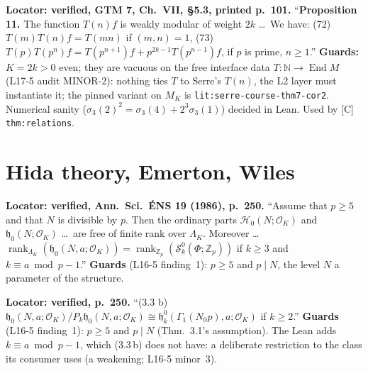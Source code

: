 \begin{hypothesis}\label{lit:serre-course-prop11}
   \leanok
  \textbf{Locator: verified, GTM 7, Ch.~VII, \S5.3, printed p.~101.} ``\textbf{Proposition 11.} The function $T(n)f$ is
  weakly modular of weight $2k$ \dots\ We have: (72) $T(m)T(n)f=T(mn)$ if $(m,n)=1$, (73)
  $T(p)T(p^n)f=T(p^{n+1})f+p^{2k-1}T(p^{n-1})f$, if $p$ is prime, $n\ge1$.''
  \textbf{Guards:} $K=2k>0$ even; they are vacuous on the free interface data $T:\mathbb N\to\operatorname{End}M$
  (L17-5 audit MINOR-2): nothing ties $T$ to Serre's $T(n)$, the L2 layer must instantiate it; the pinned variant on
  $M_K$ is \texttt{lit:serre-course-thm7-cor2}. Numerical sanity
  ($\sigma_3(2)^2=\sigma_3(4)+2^3\sigma_3(1)$) decided in Lean. Used by [C] \texttt{thm:relations}.
\end{hypothesis}

\section{Hida theory, Emerton, Wiles}

\begin{hypothesis}\label{lit:hida-ens-3.1}
   \leanok
  \textbf{Locator: verified, Ann.\ Sci.\ \'ENS 19 (1986), p.~250.} ``Assume that $p\ge5$ and that $N$ is divisible
  by $p$. Then the ordinary parts $\mathscr{H}_0(N;\mathcal{O}_K)$ and $\mathfrak{h}_0(N;\mathcal{O}_K)$ \dots\ are
  free of finite rank over $\Lambda_K$. Moreover \dots\ $\operatorname{rank}_{\Lambda_K}(\mathfrak{h}_0(N,a;\mathcal{O}_K))
  =\operatorname{rank}_{\mathbb{Z}_p}(\mathscr{S}^0_k(\Phi;\mathbb{Z}_p))$ if $k\ge3$ and $k\equiv a\bmod p-1$.''
  \textbf{Guards} (L16-5 finding~1): $p\ge5$ and $p\mid N$, the level $N$ a parameter of the structure.
\end{hypothesis}

\begin{hypothesis}\label{lit:hida-ens-3.2}
   \leanok
  \textbf{Locator: verified, p.~250.} ``(3.3 b) $\mathfrak{h}_0(N,a;\mathcal{O}_K)/P_k\mathfrak{h}_0(N,a;\mathcal{O}_K)
  \cong\mathfrak{h}^0_k(\Gamma_1(N_0p),a;\mathcal{O}_K)$ if $k\ge2$.''
  \textbf{Guards} (L16-5 finding~1): $p\ge5$ and $p\mid N$ (Thm.~3.1's assumption). The Lean adds $k\equiv a\bmod p-1$,
  which (3.3\,b) does not have: a deliberate restriction to the class its consumer uses (a weakening; L16-5 minor~3).
\end{hypothesis}

